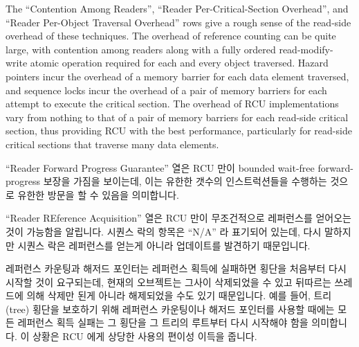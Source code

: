 The ``Contention Among Readers'', ``Reader Per-Critical-Section Overhead'',
and ``Reader Per-Object Traversal Overhead'' rows give a rough sense of
the read-side overhead of these techniques.
The overhead of reference counting can be quite large, with
contention among readers along with a fully ordered read-modify-write
atomic operation required for each and every object traversed.
Hazard pointers incur the overhead of a memory barrier for each data element
traversed, and sequence locks incur the overhead of a pair of memory barriers
for each attempt to execute the critical section.
The overhead of RCU implementations vary from nothing to that of a pair of
memory barriers for each read-side critical section, thus providing RCU
with the best performance, particularly for read-side critical sections
that traverse many data elements.
\fi

``Reader Forward Progress Guarantee'' 열은 RCU 만이 bounded wait-free
forward-progress 보장을 가짐을 보이는데, 이는 유한한 갯수의 인스트럭션들을
수행하는 것으로 유한한 방문을 할 수 있음을 의미합니다.

``Reader REference Acquisition'' 열은 RCU 만이 무조건적으로 레퍼런스를 얻어오는
것이 가능함을 알립니다.
시퀀스 락의 항목은 ``N/A'' 라 표기되어 있는데, 다시 말하지만 시퀀스 락은
레퍼런스를 얻는게 아니라 업데이트를 발견하기 때문입니다.
\iffalse

The ``Reader Forward Progress Guarantee'' row shows that only RCU
has a bounded wait-free forward-progress guarantee, which means that
it can carry out a finite traversal by executing a bounded number of
instructions.

The ``Reader Reference Acquisition'' rows indicates that only RCU is
capable of unconditionally acquiring references.
The entry for sequence locks is ``N/A'' because, again, sequence locks
detect updates rather than acquiring references.
\fi

레퍼런스 카운팅과 해저드 포인터는 레퍼런스 획득에 실패하면 횡단을 처음부터 다시
시작할 것이 요구되는데, 현재의 오브젝트는 그사이 삭제되었을 수 있고 뒤따르는
쓰레드에 의해 삭제만 된게 아니라 해제되었을 수도 있기 때문입니다.
예를 들어, 트리(tree) 횡단을 보호하기 위해 레퍼런스 카운팅이나 해저드 포인터를
사용할 때에는 모든 레퍼런스 획득 실패는 그 횡단을 그 트리의 루트부터 다시
시작해야 함을 의미합니다.
이 상황은 RCU 에게 상당한 사용의 편이성 이득을 줍니다.
\iffalse

Reference counting and hazard pointers require that traversals be
restarted from the beginning if a given acquisition fail because
the currrent object might be removed and all of its
possible successsors might be not only be removed, but also freed.
For example, when using reference counting or hazard pointers to
protect a tree traversal, any reference-acquisition failure requires
that the traversal be restarted from the root of the tree.
This situation gives RCU a significant ease-of-use advantage.
\fi

